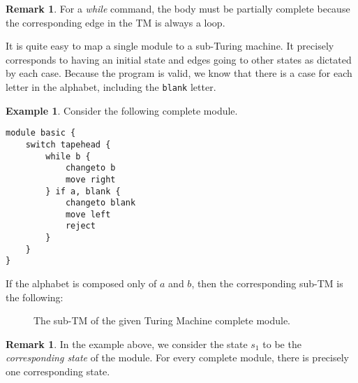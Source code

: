 \documentclass{amsart}
\theoremstyle{definition}
\newtheorem{remark}[theorem]{Remark}
\newtheorem{example}[theorem]{Example}
\begin{document}
    
    \begin{remark}
        For a \textit{while} command, the body must be partially complete because the corresponding edge in the TM is always a loop.
    \end{remark}
    
    It is quite easy to map a single module to a sub-Turing machine. It precisely corresponds to having an initial state and edges going to other states as dictated by each case. Because the program is valid, we know that there is a case for each letter in the alphabet, including the \texttt{blank} letter.
    \begin{example}
        Consider the following complete module.
\begin{lstlisting}[language=TML]
module basic {
    switch tapehead {
        while b {
            changeto b
            move right
        } if a, blank {
            changeto blank
            move left
            reject
        }
    }
}
\end{lstlisting}
    If the alphabet is composed only of $a$ and $b$, then the corresponding sub-TM is the following:
    \begin{figure}[H]
        \centering
        \caption{The sub-TM of the given Turing Machine complete module.}
    \end{figure}
    \end{example}

    \begin{remark}
        In the example above, we consider the state $s_1$ to be the \emph{corresponding state} of the module. For every complete module, there is precisely one corresponding state.
    \end{remark}
\end{document}
